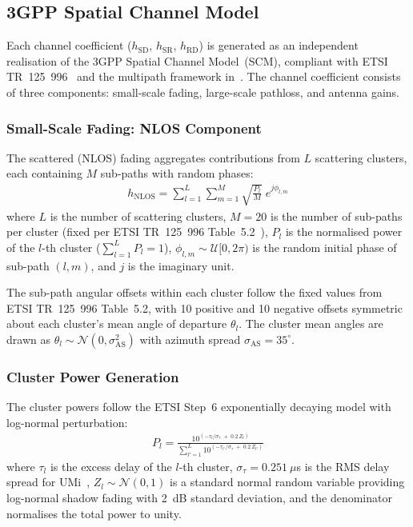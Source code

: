 \documentclass[journal]{IEEEtran} %
\begin{document}
\subsection{3GPP Spatial Channel Model}

Each channel coefficient ($h_{\mathrm{SD}}$, $h_{\mathrm{SR}}$, $h_{\mathrm{RD}}$) is generated as an independent realisation of the 3GPP Spatial Channel Model~(SCM), compliant with ETSI TR~125~996~\cite{etsi125996} and the multipath framework in~\cite{bjornson2024mimobook}. The channel coefficient consists of three components: small-scale fading, large-scale pathloss, and antenna gains.

\subsubsection{Small-Scale Fading: NLOS Component}

The scattered (NLOS) fading aggregates contributions from $L$ scattering clusters, each containing $M$ sub-paths with random phases:
\begin{align}
    h_{\mathrm{NLOS}} = \sum_{l=1}^{L}\sum_{m=1}^{M} \sqrt{\frac{P_l}{M}}\; e^{j\phi_{l,m}}
    \label{eq:h_nlos}
\end{align}
where $L$ is the number of scattering clusters, $M = 20$ is the number of sub-paths per cluster (fixed per ETSI TR~125~996 Table~5.2~\cite{etsi125996}), $P_l$ is the normalised power of the $l$-th cluster ($\sum_{l=1}^{L} P_l = 1$), $\phi_{l,m} \sim \mathcal{U}[0, 2\pi)$ is the random initial phase of sub-path $(l, m)$, and $j$ is the imaginary unit.

The sub-path angular offsets within each cluster follow the fixed values from ETSI TR~125~996 Table~5.2, with 10 positive and 10 negative offsets symmetric about each cluster's mean angle of departure $\theta_l$. The cluster mean angles are drawn as $\theta_l \sim \mathcal{N}(0, \sigma_{\mathrm{AS}}^2)$ with azimuth spread $\sigma_{\mathrm{AS}} = 35^\circ$.

\subsubsection{Cluster Power Generation}

The cluster powers follow the ETSI Step~6 exponentially decaying model with log-normal perturbation:
\begin{align}
    P_l = \frac{10^{\left(-\tau_l / \sigma_\tau \;+\; 0.2\,Z_l\right)}}{\displaystyle\sum_{l'=1}^{L} 10^{\left(-\tau_{l'} / \sigma_\tau \;+\; 0.2\,Z_{l'}\right)}}
    \label{eq:cluster_power}
\end{align}
where $\tau_l$ is the excess delay of the $l$-th cluster, $\sigma_\tau = 0.251~\mu$s is the RMS delay spread for UMi~\cite{etsi125996}, $Z_l \sim \mathcal{N}(0,1)$ is a standard normal random variable providing log-normal shadow fading with 2~dB standard deviation, and the denominator normalises the total power to unity.
\end{document}
